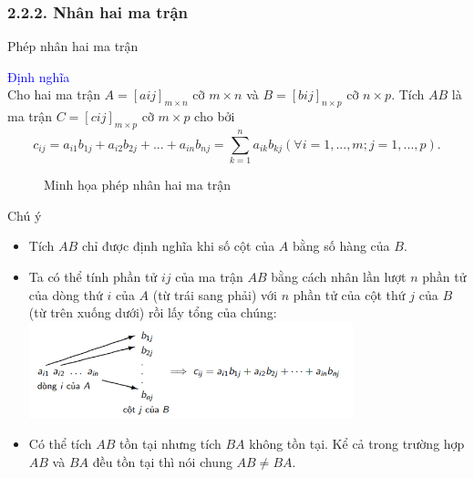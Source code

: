 \documentclass[pdf,10pt]{beamer}
\begin{document}
\subsubsection{2.2.2. Nhân hai ma trận}
\begin{frame}{Phép nhân hai ma trận}
	\begin{tcolorbox}
		\textcolor{blue}{Định nghĩa}\\
		Cho hai ma trận $A= [aij]_{m \times n}$ cỡ $m \times n$ và $B = [bij]_{n \times p}$ cỡ $n \times p$. Tích $AB$ là ma trận $C = [cij]_{m \times p}$ cỡ $m \times p$ cho bởi
		\begin{displaymath}
			c_{ij} = a_{i1}b_{1j} + a_{i2}b_{2j} + ... + a_{in}b_{nj} = \sum_{k=1}^{n} a_{ik}b_{kj} (\forall i=1,...,m;j=1,...,p).
		\end{displaymath}
	\end{tcolorbox}
	\begin{figure}[tbh]
		\caption{Minh họa phép nhân hai ma trận}
		\label{fig:mult}
	\end{figure}
\end{frame}

\begin{frame}{Chú ý}
	\begin{itemize}
		\item Tích $AB$ chỉ được định nghĩa khi số cột của $A$ bằng số hàng của $B$.
		\item Ta có thể tính phần tử $ij$ của ma trận $AB$ bằng cách nhân lần lượt $n$ phần tử của dòng thứ $i$ của $A$ (từ trái sang phải) với $n$ phần tử của cột thứ $j$ của $B$ (từ trên xuống dưới) rồi lấy tổng của chúng: \\
		\includegraphics[width=3.7in]{Picture1.png}
		\item Có thể tích $AB$ tồn tại nhưng tích $BA$ không tồn tại. Kể cả trong trường hợp $AB$ và $BA$ đều tồn tại thì nói chung $AB \neq BA$.
	\end{itemize}
\end{frame}
\end{document}
